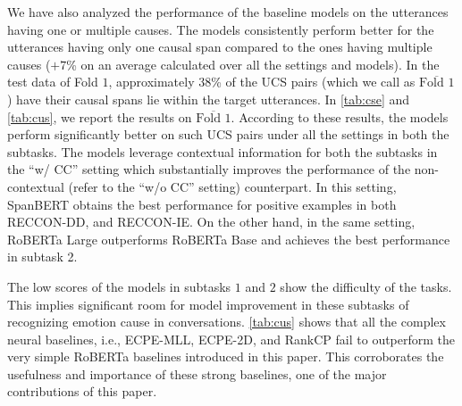 \documentclass[smallextended]{svjour3}
\newcommand\RECCON{recognizing emotion cause in conversations} \newcommand\ECRIC{ECRIC}
\newcommand\RECCONDADD{RECCON-DD}
\newcommand\RECCONDAIE{RECCON-IE}
\newcommand\0{\hphantom{0}}
\begin{document}
We have also analyzed the performance of the baseline models on the utterances having one or multiple causes. The models consistently perform better for the utterances having only one causal span compared to the ones having multiple causes ($+7$\% on an average calculated over all the settings and models). In the test data of Fold $1$, approximately 38\% of the UCS pairs (which we call as $\overline{\text{Fold 1}}$ ) have their causal spans lie within the target utterances. In \cref{tab:cse} and \ref{tab:cus}, we report the results on $\overline{\text{Fold 1}}$. According to these results, the models perform significantly better on such UCS pairs under all the settings in both the subtasks. The models leverage contextual information for both the subtasks in the ``w/ CC'' setting which substantially improves the performance of the non-contextual (refer to the ``w/o CC'' setting) counterpart. In this setting, SpanBERT obtains the best performance for positive examples in both \RECCONDADD{}, and \RECCONDAIE{}. On the other hand, in the same setting, RoBERTa Large outperforms RoBERTa Base and achieves the best performance in subtask 2.


The low scores of the models in 
subtasks $1$ and $2$ 
show
the difficulty of the tasks. 
This implies
significant room for model improvement in these 
subtasks of \RECCON{}.
\cref{tab:cus} shows
that all the complex neural baselines, i.e., ECPE-MLL, ECPE-2D, and RankCP fail to outperform the very simple RoBERTa baselines introduced in this paper. This corroborates the usefulness and importance of these strong baselines, one of the major contributions of this paper.























    
\end{document}
